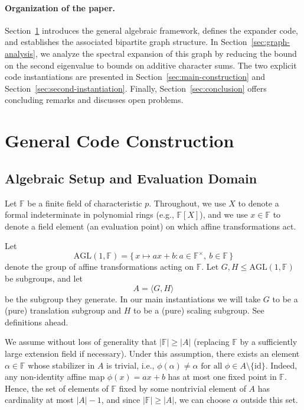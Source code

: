 \documentclass[11pt]{article}
\theoremstyle{plain}
\theoremstyle{definition}
\begin{document}
\bigskip
\paragraph{Organization of the paper.}
Section~\ref{sec:general} introduces the general algebraic framework, defines the expander code, and establishes the associated bipartite graph structure.
In Section~\ref{sec:graph-analysis}, we analyze the spectral expansion of this graph by reducing the bound on the second eigenvalue to bounds on additive character sums.
The two explicit code instantiations are presented in Section~\ref{sec:main-construction} and Section~\ref{sec:second-instantiation}.
Finally, Section~\ref{sec:conclusion} offers concluding remarks and discusses open problems.




\section{General Code Construction}\label{sec:general}

\subsection{Algebraic Setup and Evaluation Domain}
\label{Algebraic_Setup}
Let $\mathbb{F}$ be a finite field of characteristic $p$. 
Throughout, we use $X$ to denote a formal indeterminate in polynomial rings (e.g., $\mathbb{F}[X]$), and we use $x\in\mathbb{F}$ to denote a field element (an evaluation point) on which affine transformations act.


Let
\[
\mathrm{AGL}(1,\mathbb{F})=\{\,x\mapsto ax+b : a\in \mathbb{F}^{\times},\ b\in \mathbb{F}\,\}
\]
denote the group of affine transformations acting on $\mathbb{F}$. Let $G,H\le \mathrm{AGL}(1,\mathbb{F})$ be subgroups, and let
\[
A=\langle G,H\rangle
\]
be the subgroup they generate.
In our main instantiations we will take $G$ to be a (pure) translation subgroup and $H$ to be a (pure) scaling subgroup. See definitions ahead.

We assume without loss of generality that $|\mathbb{F}|\ge |A|$ (replacing $\mathbb{F}$ by a sufficiently large extension field if necessary). Under this assumption, there exists an element $\alpha\in \mathbb{F}$ whose stabilizer in $A$ is trivial, i.e.,
$
\phi(\alpha)\neq \alpha \text{ for all } \phi\in A\setminus\{\mathrm{id}\}.
$
Indeed, any non-identity affine map $\phi(x)=ax+b$ has at most one fixed point in $\mathbb{F}$. Hence, the set of elements of $\mathbb{F}$ fixed by some nontrivial element of $A$ has cardinality at most $|A|-1$, and since $|\mathbb{F}|\ge |A|$, we can choose $\alpha$ outside this set.
\end{document}
